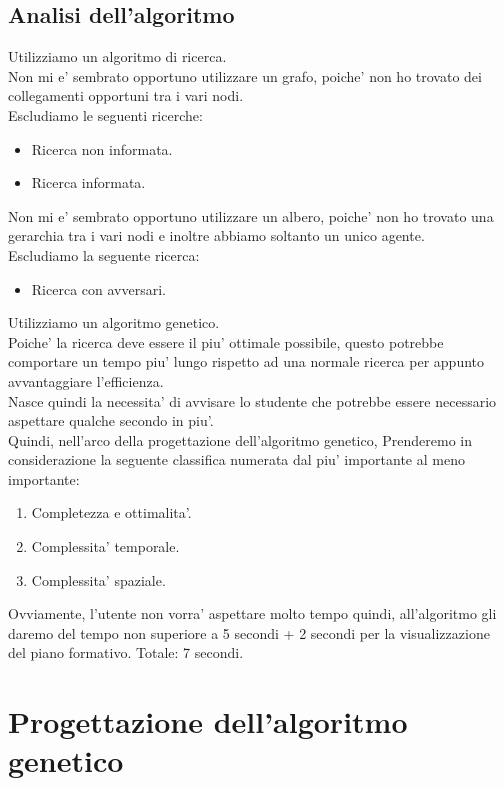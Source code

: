 \documentclass[10pt,a4paper]{article}
\begin{document}
    \subsection{Analisi dell'algoritmo}
      \label{analisiDellAlgoritmoSubsection}
      Utilizziamo un algoritmo di ricerca.\\
      Non mi e' sembrato opportuno utilizzare un grafo, poiche' non ho trovato dei collegamenti opportuni 
      tra i vari nodi.\\
      Escludiamo le seguenti ricerche:
      \begin{itemize}
        \item Ricerca non informata.
        \item Ricerca informata.
      \end{itemize}
      Non mi e' sembrato opportuno utilizzare un albero, poiche' non ho trovato una gerarchia tra i vari nodi e 
      inoltre abbiamo soltanto un unico agente.\\
      Escludiamo la seguente ricerca:
      \begin{itemize}
        \item Ricerca con avversari.
      \end{itemize}
      Utilizziamo un algoritmo genetico.\\
      Poiche' la ricerca deve essere il piu' ottimale possibile, questo 
      potrebbe comportare un tempo piu' lungo rispetto ad una normale ricerca per appunto avvantaggiare l'efficienza.\\
      Nasce quindi la necessita' di avvisare lo studente che potrebbe essere necessario aspettare qualche secondo in piu'.\\
      Quindi, nell'arco della progettazione dell'algoritmo genetico, Prenderemo in considerazione la 
      seguente classifica numerata dal piu' importante al meno importante:
      \begin{enumerate}
        \item Completezza e ottimalita'.
        \item Complessita' temporale.
        \item Complessita' spaziale.
      \end{enumerate}
      Ovviamente, l'utente non vorra' aspettare molto tempo quindi, all'algoritmo gli daremo del tempo 
      non superiore a 5 secondi + 2 secondi per la visualizzazione del piano formativo. Totale: 7 secondi.
        
  \section{Progettazione dell'algoritmo genetico}
    \label{progettazioneDellAlgoritmoGeneticoSection}
    
\end{document}
